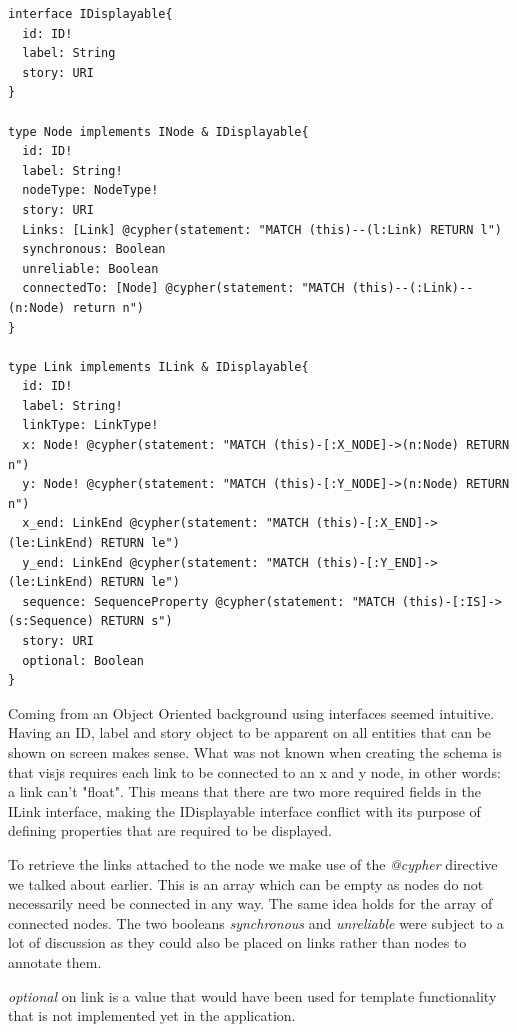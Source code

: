 \begin{lstlisting}[caption={Usage of Interfaces in GraphQL}]
interface IDisplayable{
  id: ID!
  label: String
  story: URI
}

type Node implements INode & IDisplayable{
  id: ID!
  label: String!
  nodeType: NodeType!
  story: URI
  Links: [Link] @cypher(statement: "MATCH (this)--(l:Link) RETURN l")
  synchronous: Boolean
  unreliable: Boolean
  connectedTo: [Node] @cypher(statement: "MATCH (this)--(:Link)--(n:Node) return n")
}
  
type Link implements ILink & IDisplayable{
  id: ID!
  label: String!
  linkType: LinkType!
  x: Node! @cypher(statement: "MATCH (this)-[:X_NODE]->(n:Node) RETURN n")
  y: Node! @cypher(statement: "MATCH (this)-[:Y_NODE]->(n:Node) RETURN n")
  x_end: LinkEnd @cypher(statement: "MATCH (this)-[:X_END]->(le:LinkEnd) RETURN le")
  y_end: LinkEnd @cypher(statement: "MATCH (this)-[:Y_END]->(le:LinkEnd) RETURN le")
  sequence: SequenceProperty @cypher(statement: "MATCH (this)-[:IS]->(s:Sequence) RETURN s")
  story: URI
  optional: Boolean
}

\end{lstlisting}
Coming from an Object Oriented background using interfaces seemed intuitive. Having an ID, label and story object to be apparent on all entities that can be shown on screen makes sense. What was not known when creating the schema is that visjs requires each link to be connected to an x and y node, in other words: a link can't "float". This means that there are two more required fields in the ILink interface, making the IDisplayable interface conflict with its purpose of defining properties that are required to be displayed.

To retrieve the links attached to the node we make use of the \emph{@cypher} directive we talked about earlier. This is an array which can be empty as nodes do not necessarily need be connected in any way. The same idea holds for the array of connected nodes. The two booleans \emph{synchronous} and \emph{unreliable} were subject to a lot of discussion as they could also be placed on links rather than nodes to annotate them.

\emph{optional} on link is a value that would have been used for template functionality that is not implemented yet in the application.


